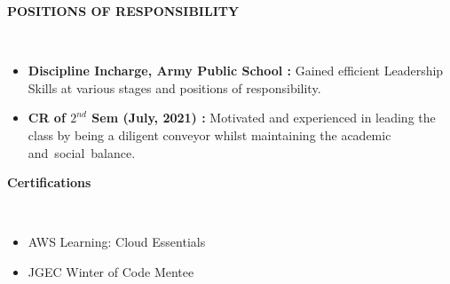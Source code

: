 \documentclass[a4paper,10pt]{article}
\newcommand{\lsep}{-0.5cm}
\newcommand{\resheading}[1]{{\small \colorbox{mygrey}{\begin{minipage}{0.975\textwidth}{\textbf{#1 \vphantom{p\^{E}}}}\end{minipage}}}}
\begin{document}
\resheading{\textbf{POSITIONS OF RESPONSIBILITY} }\\[\lsep]
\begin{itemize}
\setlength\itemsep{0em}
\item \noindent \textbf{Discipline Incharge, Army Public School :} Gained efficient Leadership Skills at various stages and positions of responsibility.
\item \noindent \textbf{CR of ${2^{nd}}$ Sem (July, 2021) :}  Motivated and experienced in leading the class by being a diligent conveyor whilst maintaining the academic and social balance.

\end{itemize}

\resheading{\textbf{Certifications} }\\[\lsep]
\begin{itemize}
\setlength\itemsep{0em}
\item \noindent AWS Learning: Cloud Essentials
\item \noindent JGEC Winter of Code Mentee

\end{itemize}
\end{document}
